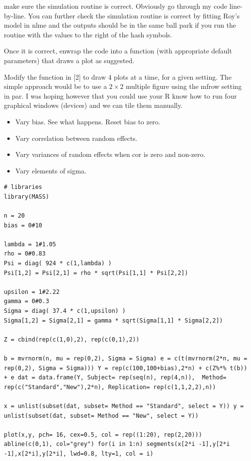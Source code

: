 make sure the simulation routine is correct. Obviously go through my code line-by-line. You can further check the simulation routine is correct by fitting Roy's model in nlme and the outputs should be in the same ball park if you run the routine with the values to the right of the hash symbols.



 Once it is correct, enwrap the code into a function (with appropriate default parameters) that draws a plot as suggested.



Modify the function in [2] to draw 4 plots at a time, for a given setting. The simple approach would be to use a $2\times2$ multiple figure using the mfrow setting in par. I was hoping however that you could use your R know how to run four graphical windows (devices) and we can tile them manually.


\begin{itemize}
\item Vary bias. See what happens. Reset bias to zero.
\item Vary correlation between random effects.
\item Vary variances of random effects when cor is zero and non-zero.
\item  Vary elements of sigma.
\end{itemize}



\begin{framed}
\begin{verbatim}
# libraries
library(MASS)

n = 20
bias = 0#10

lambda = 1#1.05
rho = 0#0.83
Psi = diag( 924 * c(1,lambda) )
Psi[1,2] = Psi[2,1] = rho * sqrt(Psi[1,1] * Psi[2,2])

upsilon = 1#2.22
gamma = 0#0.3
Sigma = diag( 37.4 * c(1,upsilon) )
Sigma[1,2] = Sigma[2,1] = gamma * sqrt(Sigma[1,1] * Sigma[2,2])

Z = cbind(rep(c(1,0),2), rep(c(0,1),2))

b = mvrnorm(n, mu = rep(0,2), Sigma = Sigma) e = c(t(mvrnorm(2*n, mu = rep(0,2), Sigma = Sigma))) Y = rep(c(100,100+bias),2*n) + c(Z%*% t(b)) + e dat = data.frame(Y, Subject= rep(seq(n), rep(4,n)),  Method= rep(c("Standard","New"),2*n), Replication= rep(c(1,1,2,2),n))

x = unlist(subset(dat, subset= Method == "Standard", select = Y)) y = unlist(subset(dat, subset= Method == "New", select = Y))

plot(x,y, pch= 16, cex=0.5, col = rep((1:20), rep(2,20))) abline(c(0,1), col="grey") for(i in 1:n) segments(x[2*i -1],y[2*i -1],x[2*i],y[2*i], lwd=0.8, lty=1, col = i)

\end{verbatim}
\end{framed}


